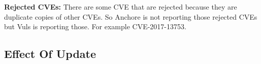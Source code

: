 \documentclass[a4paper,num-refs]{oup-contemporary}
\begin{document}
\textbf{Rejected CVEs:} There are some CVE that are rejected because they are duplicate copies of other CVEs. 
	So Anchore is not reporting those rejected CVEs but Vuls is reporting those. For example CVE-2017-13753.
\subsection{Effect Of Update}
\end{document}
